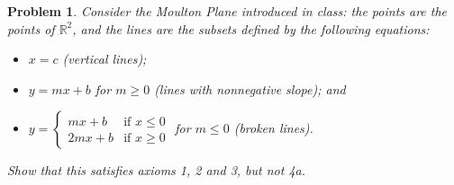\documentclass{article}
\newtheorem{problem}{Problem}
\begin{document}
\begin{problem}
Consider the Moulton Plane introduced in class: the points are the points of $\mathbb{R}^2$, and the lines are the subsets defined by the following equations:
\begin{itemize}
\item $x = c$ (vertical lines);
\item $y = mx + b$ for $m \geq 0$ (lines with nonnegative slope); and
\item $y = \begin{cases} mx+b & \text{if $x \leq 0$}\\ 2mx + b & \text{if $x \geq 0$} \end{cases}$ for $m \leq 0$ (broken lines).
\end{itemize}
Show that this satisfies axioms 1, 2 and 3, but not 4a.
\end{problem}
\end{document}
